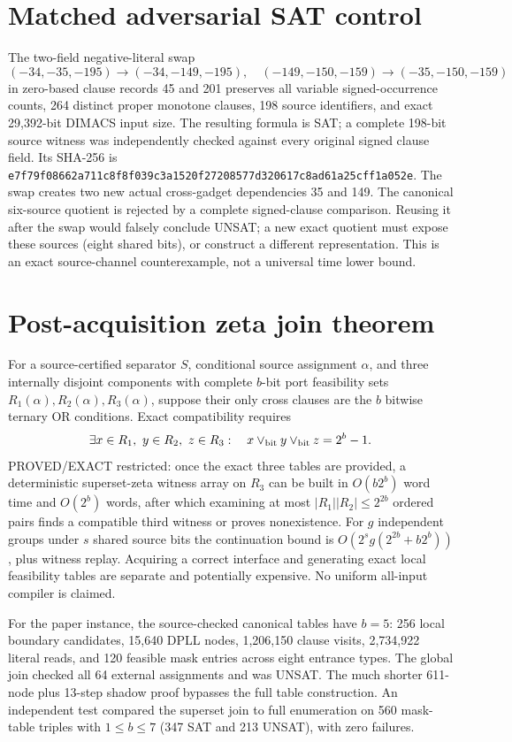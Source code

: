 \documentclass[10pt]{article}
\begin{document}
\section{Matched adversarial SAT control}
The two-field negative-literal swap
\[
(-34,-35,-195)\to(-34,-149,-195),\quad
(-149,-150,-159)\to(-35,-150,-159)
\]
in zero-based clause records 45 and 201 preserves all variable signed-occurrence counts, 264 distinct proper monotone clauses, 198 source identifiers, and exact 29,392-bit DIMACS input size. The resulting formula is SAT; a complete 198-bit source witness was independently checked against every original signed clause field. Its SHA-256 is
\texttt{e7f79f08662a711c8f8f039c3a1520f27208577d320617c8ad61a25cff1a052e}.
The swap creates two new actual cross-gadget dependencies 35 and 149. The canonical six-source quotient is rejected by a complete signed-clause comparison. Reusing it after the swap would falsely conclude UNSAT; a new exact quotient must expose these sources (eight shared bits), or construct a different representation. This is an exact source-channel counterexample, not a universal time lower bound.

\section{Post-acquisition zeta join theorem}
For a source-certified separator $S$, conditional source assignment $\alpha$, and three internally disjoint components with complete $b$-bit port feasibility sets $R_1(\alpha),R_2(\alpha),R_3(\alpha)$, suppose their only cross clauses are the $b$ bitwise ternary OR conditions. Exact compatibility requires
\[
\exists x\in R_1,\ y\in R_2,\ z\in R_3:
\quad x\vee_{\rm bit}y\vee_{\rm bit}z=2^b-1.
\]
PROVED/EXACT restricted: once the exact three tables are provided, a deterministic superset-zeta witness array on $R_3$ can be built in $O(b2^b)$ word time and $O(2^b)$ words, after which examining at most $|R_1||R_2|\le2^{2b}$ ordered pairs finds a compatible third witness or proves nonexistence. For $g$ independent groups under $s$ shared source bits the continuation bound is $O(2^sg(2^{2b}+b2^b))$, plus witness replay. Acquiring a correct interface and generating exact local feasibility tables are separate and potentially expensive. No uniform all-input compiler is claimed.

For the paper instance, the source-checked canonical tables have $b=5$: 256 local boundary candidates, 15,640 DPLL nodes, 1,206,150 clause visits, 2,734,922 literal reads, and 120 feasible mask entries across eight entrance types. The global join checked all 64 external assignments and was UNSAT. The much shorter 611-node plus 13-step shadow proof bypasses the full table construction. An independent test compared the superset join to full enumeration on 560 mask-table triples with $1\le b\le7$ (347 SAT and 213 UNSAT), with zero failures.
\end{document}
